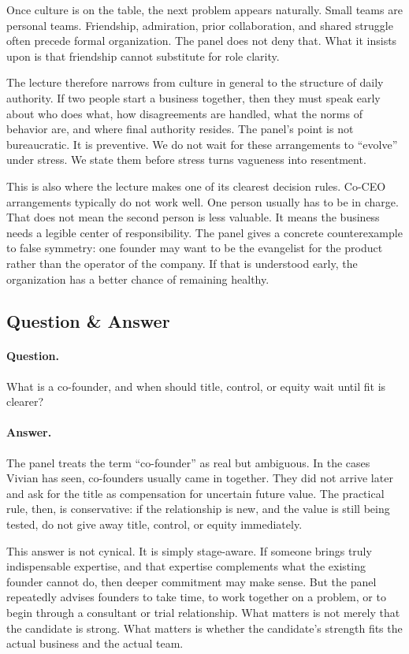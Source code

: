 Once culture is on the table, the next problem appears naturally. Small teams are personal teams. Friendship, admiration, prior collaboration, and shared struggle often precede formal organization. The panel does not deny that. What it insists upon is that friendship cannot substitute for role clarity.

The lecture therefore narrows from culture in general to the structure of daily authority. If two people start a business together, then they must speak early about who does what, how disagreements are handled, what the norms of behavior are, and where final authority resides. The panel's point is not bureaucratic. It is preventive. We do not wait for these arrangements to ``evolve'' under stress. We state them before stress turns vagueness into resentment.

This is also where the lecture makes one of its clearest decision rules. Co-CEO arrangements typically do not work well. One person usually has to be in charge. That does not mean the second person is less valuable. It means the business needs a legible center of responsibility. The panel gives a concrete counterexample to false symmetry: one founder may want to be the evangelist for the product rather than the operator of the company. If that is understood early, the organization has a better chance of remaining healthy.

\subsection{Question \& Answer}

\paragraph{Question.} What is a co-founder, and when should title, control, or equity wait until fit is clearer?

\paragraph{Answer.} The panel treats the term ``co-founder'' as real but ambiguous. In the cases Vivian has seen, co-founders usually came in together. They did not arrive later and ask for the title as compensation for uncertain future value. The practical rule, then, is conservative: if the relationship is new, and the value is still being tested, do not give away title, control, or equity immediately.

This answer is not cynical. It is simply stage-aware. If someone brings truly indispensable expertise, and that expertise complements what the existing founder cannot do, then deeper commitment may make sense. But the panel repeatedly advises founders to take time, to work together on a problem, or to begin through a consultant or trial relationship. What matters is not merely that the candidate is strong. What matters is whether the candidate's strength fits the actual business and the actual team.

